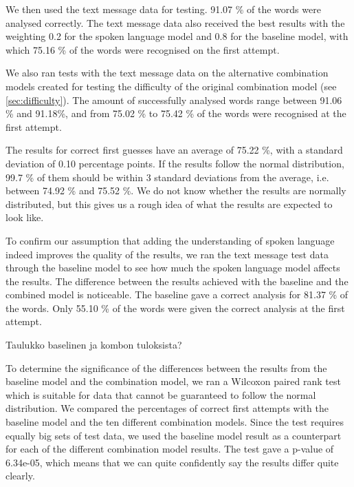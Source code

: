 \documentclass[a4paper,conference]{IEEEtran}
\begin{document}
We then used the text message data for testing. 91.07 \% of the words were analysed correctly. The text message data also received the best results with the weighting 0.2 for the spoken language model and 0.8 for the baseline model, with which 75.16 \% of the words were recognised on the first attempt.

We also ran tests with the text message data on the alternative combination models created for testing the difficulty of the original combination model (see \ref{sec:difficulty}). The amount of successfully analysed words range between 91.06 \% and 91.18\%, and from 75.02 \% to 75.42 \% of the words were recognised at the first attempt. 

The results for correct first guesses have an average of 75.22 \%, with a standard deviation of 0.10 percentage points. If the results follow the normal distribution, 99.7 \% of them should be within 3 standard deviations from the average, i.e. between 74.92 \% and 75.52 \%. We do not know whether the results are normally distributed, but this gives us a rough idea of what the results are expected to look like.


To confirm our assumption that adding the understanding of spoken language indeed improves the quality of the results, we ran the text message test data through the baseline model to see how much the spoken language model affects the results. The difference between the results achieved with the baseline and the combined model is noticeable. The baseline gave a correct analysis for 81.37 \% of the words. Only 55.10 \% of the words were given the correct analysis at the first attempt.

Taulukko baselinen ja kombon tuloksista?

To determine the significance of the differences between the results from the baseline model and the combination model, we ran a Wilcoxon paired rank test which is suitable for data that cannot be guaranteed to follow the normal distribution. We compared the percentages of correct first attempts with the baseline model and the ten different combination models. Since the test requires equally big sets of test data, we used the baseline model result as a counterpart for each of the different combination model results. The test gave a p-value of 6.34e-05, which means that we can quite confidently say the results differ quite clearly.
\end{document}
